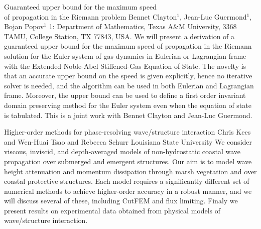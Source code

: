 \begin{addmargin}[2em]{0em}
\vspace{1.5ex}
\abs
{Guaranteed upper bound for the maximum speed\\ of propagation in the Riemann problem}
{Bennet Clayton$^1$, Jean-Luc Guermond$^1$, Bojan Popov$^1$}
{1: Department of Mathematics, Texas A\&M University, 3368 TAMU, College Station, TX 77843, USA.}
{We will present a derivation of a guaranteed upper bound for the maximum speed of propagation in the Riemann solution for the Euler system of gas dynamics in Eulerian or Lagrangian frame with the Extended Noble-Abel Stiffened-Gas Equation of State. The novelty is that an accurate upper bound on the speed is given explicitly, hence no iterative solver is needed, and the algorithm can be used in both Eulerian and Lagrangian frame. Moreover, the upper bound can be used to define a first order invariant domain preserving method for the Euler system even when the equation of state is tabulated. 	This is a joint work with Bennet Clayton and Jean-Luc Guermond.}


\vspace{1.5ex}
\abs
{Higher-order methods for phase-resolving wave/structure interaction}
{Chris Kees and Wen-Huai Tsao and Rebecca Schurr}
{Louisiana State University}
{We consider viscous, inviscid, and depth-averaged models of
	non-hydrostatic coastal wave propagation over submerged and emergent
	structures. Our aim is to model wave height attenuation and momentum
	dissipation through marsh vegetation and over coastal protective
	structures. Each model requires a significantly different set of
	numerical methods to achieve higher-order accuracy in a robust manner,
	and we will discuss several of these, including CutFEM and flux
	limiting. Finaly we present results on experimental data obtained from
	physical models of wave/structure interaction.}
\end{addmargin}
